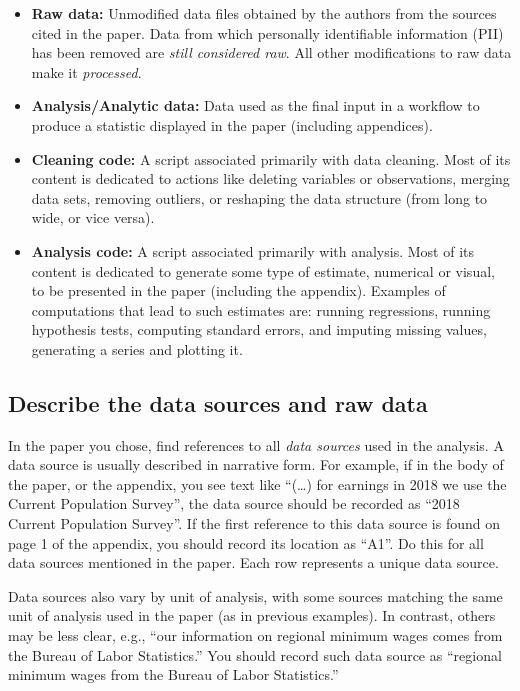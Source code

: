 \documentclass[
  openany]{book}
\providecommand{\tightlist}{%
  \setlength{\itemsep}{0pt}\setlength{\parskip}{0pt}}
\begin{document}
\begin{itemize}
\tightlist
\item
  \textbf{Raw data:} Unmodified data files obtained by the authors from the sources cited in the paper. Data from which personally identifiable information (PII) has been removed are \emph{still considered raw}. All other modifications to raw data make it \emph{processed}.\\
\item
  \textbf{Analysis/Analytic data:} Data used as the final input in a workflow to produce a statistic displayed in the paper (including appendices).\\
\item
  \textbf{Cleaning code:} A script associated primarily with data cleaning. Most of its content is dedicated to actions like deleting variables or observations, merging data sets, removing outliers, or reshaping the data structure (from long to wide, or vice versa).\\
\item
  \textbf{Analysis code:} A script associated primarily with analysis. Most of its content is dedicated to generate some type of estimate, numerical or visual, to be presented in the paper (including the appendix). Examples of computations that lead to such estimates are: running regressions, running hypothesis tests, computing standard errors, and imputing missing values, generating a series and plotting it.
\end{itemize}

\hypertarget{desc-sourc}{%
\subsection{Describe the data sources and raw data}\label{desc-sourc}}

In the paper you chose, find references to all \emph{data sources} used in the analysis. A data source is usually described in narrative form. For example, if in the body of the paper, or the appendix, you see text like ``(\ldots) for earnings in 2018 we use the Current Population Survey'', the data source should be recorded as ``2018 Current Population Survey''. If the first reference to this data source is found on page 1 of the appendix, you should record its location as ``A1''. Do this for all data sources mentioned in the paper. Each row represents a unique data source.

Data sources also vary by unit of analysis, with some sources matching the same unit of analysis used in the paper (as in previous examples). In contrast, others may be less clear, e.g., ``our information on regional minimum wages comes from the Bureau of Labor Statistics.'' You should record such data source as ``regional minimum wages from the Bureau of Labor Statistics.''
\end{document}

